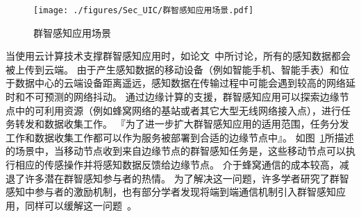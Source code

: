 \begin{figure}[!b]
  \centering
  \vspace{-1em}
  \texttt{[image: ./figures/Sec\_UIC/群智感知应用场景.pdf]}
  \vspace{-0.5em}
  \caption{群智感知应用场景}
  \label{Figure_UIC_MCS}
\end{figure}

当使用云计算技术支撑群智感知应用时，如论文~\cite{DBLP:journals/fgcs/AntonicMPZ16,DBLP:conf/ccnc/MessaoudRG16}中所讨论，所有的感知数据都会被上传到云端。
由于产生感知数据的移动设备（例如智能手机、智能手表）和位于数据中心的云端设备距离遥远，感知数据在传输过程中可能会遇到较高的网络延时和不可预测的网络抖动。
通过边缘计算的支援，群智感知应用可以探索边缘节点中的可利用资源（例如蜂窝网络的基站或者其它大型无线网络接入点），进行任务转发和数据收集工作。
『为了进一步扩大群智感知应用的适用范围，任务分发工作和数据收集工作都可以作为服务被部署到合适的边缘节点中』。
如图~\ref{Figure_UIC_MCS}所描述的场景中，当移动节点收到来自边缘节点的群智感知任务是，这些移动节点可以执行相应的传感操作并将感知数据反馈给边缘节点。
介于蜂窝通信的成本较高，减退了许多潜在群智感知参与者的热情。
为了解决这一问题，许多学者研究了群智感知中参与者的激励机制，也有部分学者发现将端到端通信机制引入群智感知应用，同样可以缓解这一问题~\cite{DBLP:journals/puc/WangLL17}。


